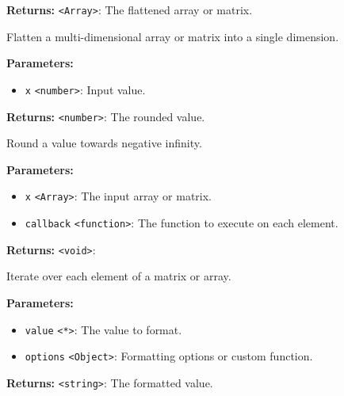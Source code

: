 \documentclass[12pt,a4paper]{article}
\begin{document}
\noindent \textbf{Returns:} \texttt{<Array>}: The flattened array or matrix.

\noindent Flatten a multi-dimensional array or matrix into a single dimension.

\vspace{5mm}
\noindent {}


\noindent \textbf{Parameters:}
\begin{itemize}
  \item \texttt{x} \texttt{<number>}: Input value.
\end{itemize}

\noindent \textbf{Returns:} \texttt{<number>}: The rounded value.

\noindent Round a value towards negative infinity.

\vspace{5mm}
\noindent {}


\noindent \textbf{Parameters:}
\begin{itemize}
  \item \texttt{x} \texttt{<Array>}: The input array or matrix.
  \item \texttt{callback} \texttt{<function>}: The function to execute on each element.
\end{itemize}

\noindent \textbf{Returns:} \texttt{<void>}:

\noindent Iterate over each element of a matrix or array.

\vspace{5mm}
\noindent {}


\noindent \textbf{Parameters:}
\begin{itemize}
  \item \texttt{value} \texttt{<*>}: The value to format.
  \item \texttt{options} \texttt{<Object>}: Formatting options or custom function.
\end{itemize}

\noindent \textbf{Returns:} \texttt{<string>}: The formatted value.
\end{document}
